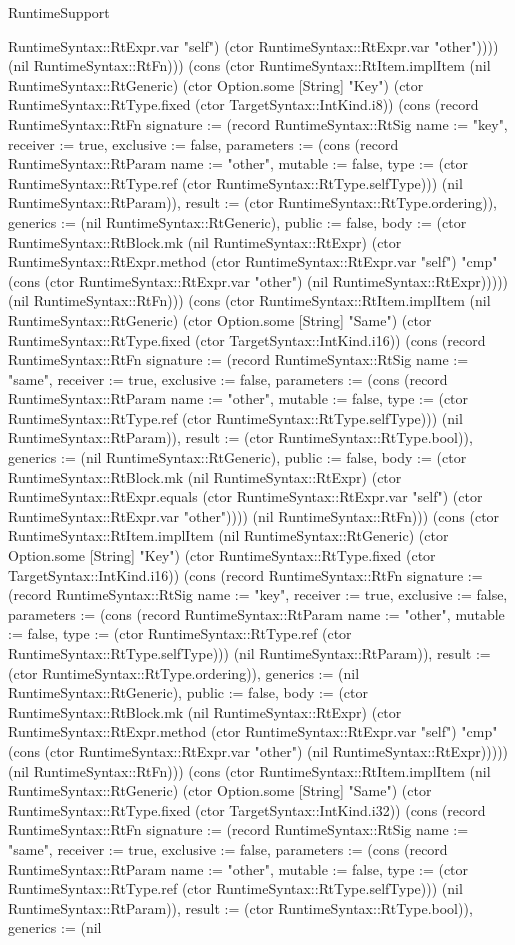 \begin{lexlean}{RuntimeSupport}
\begin{semanticmodule}
{RuntimeSyntax::RtExpr.var "self") (ctor RuntimeSyntax::RtExpr.var "other")))}) (nil RuntimeSyntax::RtFn))) (cons (ctor RuntimeSyntax::RtItem.implItem (nil RuntimeSyntax::RtGeneric) (ctor Option.some [String] "Key") (ctor RuntimeSyntax::RtType.fixed (ctor TargetSyntax::IntKind.i8)) (cons (record RuntimeSyntax::RtFn {signature := (record RuntimeSyntax::RtSig {name := "key", receiver := true, exclusive := false, parameters := (cons (record RuntimeSyntax::RtParam {name := "other", mutable := false, type := (ctor RuntimeSyntax::RtType.ref (ctor RuntimeSyntax::RtType.selfType))}) (nil RuntimeSyntax::RtParam)), result := (ctor RuntimeSyntax::RtType.ordering)}), generics := (nil RuntimeSyntax::RtGeneric), public := false, body := (ctor RuntimeSyntax::RtBlock.mk (nil RuntimeSyntax::RtExpr) (ctor RuntimeSyntax::RtExpr.method (ctor RuntimeSyntax::RtExpr.var "self") "cmp" (cons (ctor RuntimeSyntax::RtExpr.var "other") (nil RuntimeSyntax::RtExpr))))}) (nil RuntimeSyntax::RtFn))) (cons (ctor RuntimeSyntax::RtItem.implItem (nil RuntimeSyntax::RtGeneric) (ctor Option.some [String] "Same") (ctor RuntimeSyntax::RtType.fixed (ctor TargetSyntax::IntKind.i16)) (cons (record RuntimeSyntax::RtFn {signature := (record RuntimeSyntax::RtSig {name := "same", receiver := true, exclusive := false, parameters := (cons (record RuntimeSyntax::RtParam {name := "other", mutable := false, type := (ctor RuntimeSyntax::RtType.ref (ctor RuntimeSyntax::RtType.selfType))}) (nil RuntimeSyntax::RtParam)), result := (ctor RuntimeSyntax::RtType.bool)}), generics := (nil RuntimeSyntax::RtGeneric), public := false, body := (ctor RuntimeSyntax::RtBlock.mk (nil RuntimeSyntax::RtExpr) (ctor RuntimeSyntax::RtExpr.equals (ctor RuntimeSyntax::RtExpr.var "self") (ctor RuntimeSyntax::RtExpr.var "other")))}) (nil RuntimeSyntax::RtFn))) (cons (ctor RuntimeSyntax::RtItem.implItem (nil RuntimeSyntax::RtGeneric) (ctor Option.some [String] "Key") (ctor RuntimeSyntax::RtType.fixed (ctor TargetSyntax::IntKind.i16)) (cons (record RuntimeSyntax::RtFn {signature := (record RuntimeSyntax::RtSig {name := "key", receiver := true, exclusive := false, parameters := (cons (record RuntimeSyntax::RtParam {name := "other", mutable := false, type := (ctor RuntimeSyntax::RtType.ref (ctor RuntimeSyntax::RtType.selfType))}) (nil RuntimeSyntax::RtParam)), result := (ctor RuntimeSyntax::RtType.ordering)}), generics := (nil RuntimeSyntax::RtGeneric), public := false, body := (ctor RuntimeSyntax::RtBlock.mk (nil RuntimeSyntax::RtExpr) (ctor RuntimeSyntax::RtExpr.method (ctor RuntimeSyntax::RtExpr.var "self") "cmp" (cons (ctor RuntimeSyntax::RtExpr.var "other") (nil RuntimeSyntax::RtExpr))))}) (nil RuntimeSyntax::RtFn))) (cons (ctor RuntimeSyntax::RtItem.implItem (nil RuntimeSyntax::RtGeneric) (ctor Option.some [String] "Same") (ctor RuntimeSyntax::RtType.fixed (ctor TargetSyntax::IntKind.i32)) (cons (record RuntimeSyntax::RtFn {signature := (record RuntimeSyntax::RtSig {name := "same", receiver := true, exclusive := false, parameters := (cons (record RuntimeSyntax::RtParam {name := "other", mutable := false, type := (ctor RuntimeSyntax::RtType.ref (ctor RuntimeSyntax::RtType.selfType))}) (nil RuntimeSyntax::RtParam)), result := (ctor RuntimeSyntax::RtType.bool)}), generics := (nil }
\end{semanticmodule}
\end{lexlean}
